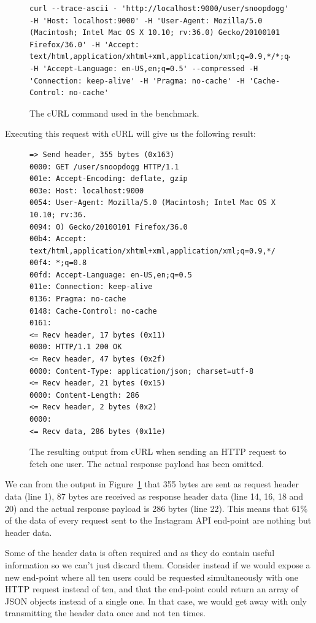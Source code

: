 \documentclass{cslthse-msc}
\begin{document}
\begin{figure}[H]
  \centering
\begin{lstlisting}[breaklines=true]
curl --trace-ascii - 'http://localhost:9000/user/snoopdogg' -H 'Host: localhost:9000' -H 'User-Agent: Mozilla/5.0 (Macintosh; Intel Mac OS X 10.10; rv:36.0) Gecko/20100101 Firefox/36.0' -H 'Accept: text/html,application/xhtml+xml,application/xml;q=0.9,*/*;q=0.8' -H 'Accept-Language: en-US,en;q=0.5' --compressed -H 'Connection: keep-alive' -H 'Pragma: no-cache' -H 'Cache-Control: no-cache'
\end{lstlisting}
  \caption{The cURL command used in the benchmark.}
\end{figure}

Executing this request with cURL will give us the following result:

\begin{figure}[H]
  \centering
\begin{lstlisting}[breaklines=true]
=> Send header, 355 bytes (0x163)
0000: GET /user/snoopdogg HTTP/1.1
001e: Accept-Encoding: deflate, gzip
003e: Host: localhost:9000
0054: User-Agent: Mozilla/5.0 (Macintosh; Intel Mac OS X 10.10; rv:36.
0094: 0) Gecko/20100101 Firefox/36.0
00b4: Accept: text/html,application/xhtml+xml,application/xml;q=0.9,*/
00f4: *;q=0.8
00fd: Accept-Language: en-US,en;q=0.5
011e: Connection: keep-alive
0136: Pragma: no-cache
0148: Cache-Control: no-cache
0161:
<= Recv header, 17 bytes (0x11)
0000: HTTP/1.1 200 OK
<= Recv header, 47 bytes (0x2f)
0000: Content-Type: application/json; charset=utf-8
<= Recv header, 21 bytes (0x15)
0000: Content-Length: 286
<= Recv header, 2 bytes (0x2)
0000:
<= Recv data, 286 bytes (0x11e)
\end{lstlisting}
  \caption{The resulting output from cURL when sending an HTTP request to fetch one user. The actual response payload has been omitted.}
  \label{fig:headers_overhead}
\end{figure}

We can from the output in Figure~\ref{fig:headers_overhead} that 355 bytes are sent as request header data (line 1), 87 bytes are received as response header data (line 14, 16, 18 and 20) and the actual response payload is 286 bytes (line 22). This means that 61\% of the data of every request sent to the Instagram API end-point are nothing but header data.

Some of the header data is often required and as they do contain useful information so we can't just discard them. Consider instead if we would expose a new end-point where all ten users could be requested simultaneously with one HTTP request instead of ten, and that the end-point could return an array of JSON objects instead of a single one. In that case, we would get away with only transmitting the header data once and not ten times.
\end{document}
